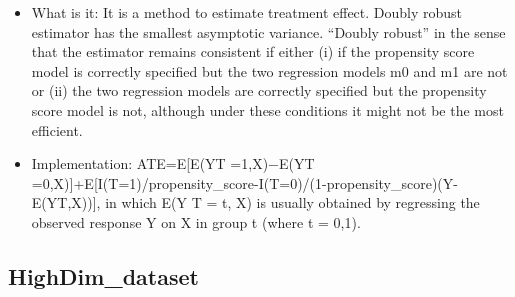 \documentclass[]{article}
\newenvironment{Shaded}{\begin{snugshade}}{\end{snugshade}}
\newcommand{\CommentTok}[1]{\textcolor[rgb]{0.56,0.35,0.01}{\textit{#1}}}
\newcommand{\DataTypeTok}[1]{\textcolor[rgb]{0.13,0.29,0.53}{#1}}
\newcommand{\DecValTok}[1]{\textcolor[rgb]{0.00,0.00,0.81}{#1}}
\newcommand{\KeywordTok}[1]{\textcolor[rgb]{0.13,0.29,0.53}{\textbf{#1}}}
\newcommand{\NormalTok}[1]{#1}
\newcommand{\OperatorTok}[1]{\textcolor[rgb]{0.81,0.36,0.00}{\textbf{#1}}}
\newcommand{\StringTok}[1]{\textcolor[rgb]{0.31,0.60,0.02}{#1}}
\providecommand{\tightlist}{%
  \setlength{\itemsep}{0pt}\setlength{\parskip}{0pt}}
\begin{document}
\begin{itemize}
\tightlist
\item
  What is it: It is a method to estimate treatment effect. Doubly robust
  estimator has the smallest asymptotic variance. ``Doubly robust'' in
  the sense that the estimator remains consistent if either (i) if the
  propensity score model is correctly specified but the two regression
  models m0 and m1 are not or (ii) the two regression models are
  correctly specified but the propensity score model is not, although
  under these conditions it might not be the most efficient.
\item
  Implementation: ATE=E{[}E(Y\textbar{}T =1,X)−E(Y\textbar{}T
  =0,X){]}+E{[}I(T=1)/propensity\_score-I(T=0)/(1-propensity\_score)(Y-E(Y\textbar{}T,X)){]},
  in which E(Y \textbar{}T = t, X) is usually obtained by regressing the
  observed response Y on X in group t (where t = 0,1).
\end{itemize}

\hypertarget{highdim_dataset}{%
\subsection{HighDim\_dataset}\label{highdim_dataset}}

\begin{Shaded}
\end{Shaded}
\end{document}
